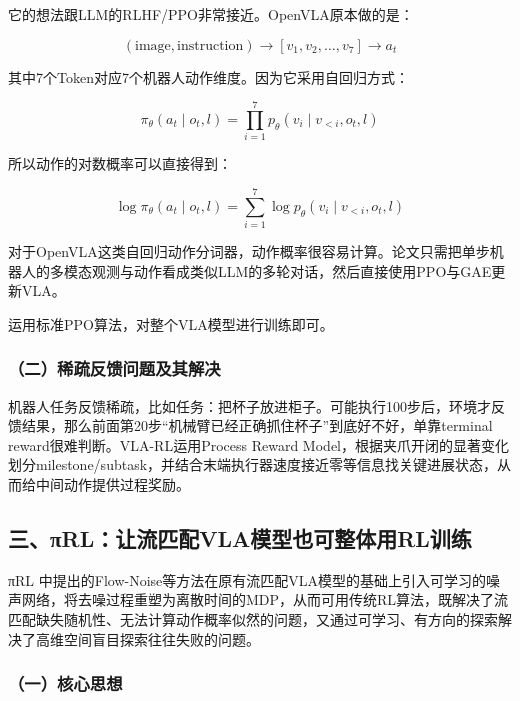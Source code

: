 它的想法跟LLM的RLHF/PPO非常接近。OpenVLA原本做的是：

\[
(\text{image},\text{instruction})
\longrightarrow
[v_1,v_2,\ldots,v_7]
\longrightarrow
a_t
\]

其中7个Token对应7个机器人动作维度。因为它采用自回归方式：

\[
\pi_\theta(a_t\mid o_t,l)=\prod_{i=1}^{7}p_\theta(v_i\mid v_{<i},o_t,l)
\]

所以动作的对数概率可以直接得到：

\[
\log\pi_\theta(a_t\mid o_t,l)=\sum_{i=1}^{7}\log p_\theta(v_i\mid v_{<i},o_t,l)
\]

对于OpenVLA这类自回归动作分词器，动作概率很容易计算。论文只需把单步机器人的多模态观测与动作看成类似LLM的多轮对话，然后直接使用PPO与GAE更新VLA。

运用标准PPO算法，对整个VLA模型进行训练即可。

\hypertarget{ux4e8cux7a00ux758fux53cdux9988ux95eeux9898ux53caux5176ux89e3ux51b3}{%
\subsubsection{（二）稀疏反馈问题及其解决}\label{ux4e8cux7a00ux758fux53cdux9988ux95eeux9898ux53caux5176ux89e3ux51b3}}

机器人任务反馈稀疏，比如任务：把杯子放进柜子。可能执行100步后，环境才反馈结果，那么前面第20步``机械臂已经正确抓住杯子''到底好不好，单靠terminal reward很难判断。VLA-RL运用Process Reward Model，根据夹爪开闭的显著变化划分milestone/subtask，并结合末端执行器速度接近零等信息找关键进展状态，从而给中间动作提供过程奖励。

\hypertarget{ux4e09ux3c0rlux8ba9ux6d41ux5339ux914dvlaux6a21ux578bux4e5fux53efux6574ux4f53ux7528rlux8badux7ec3}{%
\subsection{三、πRL：让流匹配VLA模型也可整体用RL训练}\label{ux4e09ux3c0rlux8ba9ux6d41ux5339ux914dvlaux6a21ux578bux4e5fux53efux6574ux4f53ux7528rlux8badux7ec3}}

πRL 中提出的Flow-Noise等方法在原有流匹配VLA模型的基础上引入可学习的噪声网络，将去噪过程重塑为离散时间的MDP，从而可用传统RL算法，既解决了流匹配缺失随机性、无法计算动作概率似然的问题，又通过可学习、有方向的探索解决了高维空间盲目探索往往失败的问题。

\hypertarget{ux4e00ux6838ux5fc3ux601dux60f3-15}{%
\subsubsection{（一）核心思想}\label{ux4e00ux6838ux5fc3ux601dux60f3-15}}

